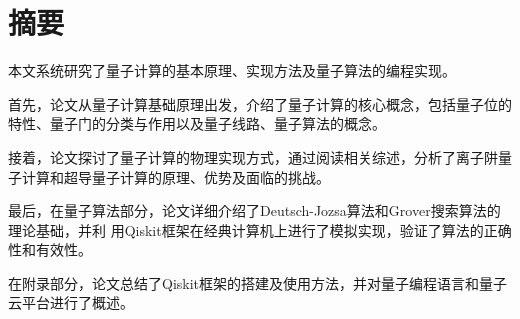 \section*{摘要}
本文系统研究了量子计算的基本原理、实现方法及量子算法的编程实现。

首先，论文从量子计算基础原理出发，介绍了量子计算的核心概念，包括量子位的特性、量子门的分类与作用以及量子线路、量子算法的概念。

接着，论文探讨了量子计算的物理实现方式，通过阅读相关综述，分析了离子阱量子计算和超导量子计算的原理、优势及面临的挑战。

最后，在量子算法部分，论文详细介绍了Deutsch-Jozsa算法和Grover搜索算法的理论基础，并利
用Qiskit框架在经典计算机上进行了模拟实现，验证了算法的正确性和有效性。

在附录部分，论文总结了Qiskit框架的搭建及使用方法，并对量子编程语言和量子云平台进行了概述。

\thispagestyle{empty}
\setcounter{page}{0}